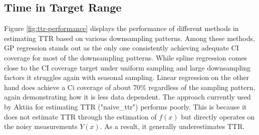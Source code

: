 \subsection{Time in Target Range}\label{subsec:time-in-target-range}

Figure \ref{fig:ttr-performance} displays the performance of different methods
in estimating TTR based on various downsampling patterns.
Among these methods, GP regression stands out as the only one consistently achieving
adequate CI coverage for most of the downsampling patterns.
While spline regression comes close to the CI coverage target
under uniform sampling and large downsampling factors it struggles again
with seasonal sampling. Linear regression on the other hand
does achieve a Ci coverage of about 70\% regardless of the sampling pattern,
again demonstrating how it is less data dependent.
The approach currently used by Aktiia for estimating TTR ("naive\_ttr")
performs poorly.
This is because it does not estimate TTR through the estimation of $f(x)$ but directly
operates on the noisy measurements $Y(x)$. As a result, it generally underestimates TTR.


